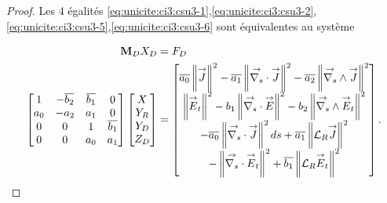 \begin{proof}
    Les 4 égalités \eqref{eq:unicite:ci3:csu3-1},\eqref{eq:unicite:ci3:csu3-2},\eqref{eq:unicite:ci3:csu3-5},\eqref{eq:unicite:ci3:csu3-6} sont équivalentes au système

    \begin{align*}
      \mM_D  X_D & =  F_D
      \\
      \begin{bmatrix}
        1 & -\conj{b_2} & \conj{b_1} & 0
        \\
        a_0 & -a_2 & a_1 & 0
        \\
        0 & 0 & 1 & \conj{b_1}
        \\
        0 & 0 & a_0 & a_1
      \end{bmatrix}
      \begin{bmatrix}
        X
        \\
        Y_R
        \\
        Y_D
        \\
        Z_D
      \end{bmatrix}
      & =
      \begin{bmatrix}
        \conj{a_0} \norm{\vJ}^2 - \conj{a_1} \norm{\vdivs \vJ}^2 - \conj{a_2} \norm{\vrots \vJ}^2  \\
        \norm{\vE_t}^2   - b_1 \norm{\vdivs \vE }^2  - b_2 \norm{\vrots \vE_t}^2  \\
        -\conj{a_0} \norm{\vdivs \vJ}^2ds + \conj{a_1} \norm{\LR \vJ}^2  \\
        -\norm{\vdivs \vE_t}^2   + \conj{b_1} \norm{\LR \vE_t}^2 
      \end{bmatrix}.
    \end{align*}


\end{proof}
